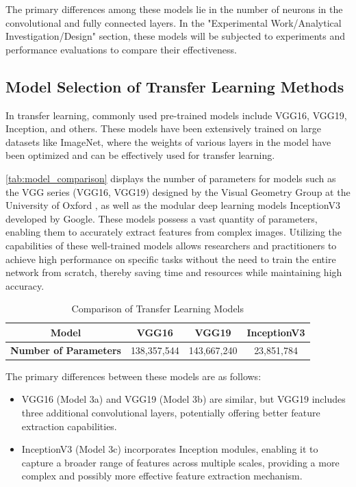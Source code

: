 The primary differences among these models lie in the number of neurons in the convolutional and fully connected layers. In the "Experimental Work/Analytical Investigation/Design" section, these models will be subjected to experiments and performance evaluations to compare their effectiveness.

\subsection{Model Selection of Transfer Learning Methods}
In transfer learning, commonly used pre-trained models include VGG16, VGG19, Inception, and others. These models have been extensively trained on large datasets like ImageNet, where the weights of various layers in the model have been optimized and can be effectively used for transfer learning\cite{4.30 7}.

\autoref{tab:model_comparison} displays the number of parameters for models such as the VGG series (VGG16, VGG19) designed by the Visual Geometry Group at the University of Oxford \cite{DL.5}, as well as the modular deep learning models InceptionV3 \cite{DL.6}\cite{DL.7} developed by Google. These models possess a vast quantity of parameters, enabling them to accurately extract features from complex images. Utilizing the capabilities of these well-trained models allows researchers and practitioners to achieve high performance on specific tasks without the need to train the entire network from scratch, thereby saving time and resources while maintaining high accuracy\cite{4.30 8}.

\begin{table}[H]
    \centering
    \caption{Comparison of Transfer Learning Models}
    \label{tab:model_comparison}
    \begin{tabular}{cccc}
        \toprule
        \textbf{Model} & \textbf{VGG16} & \textbf{VGG19} & \textbf{InceptionV3}\\
        \midrule
        \textbf{Number of Parameters} & 138,357,544 & 143,667,240 & 23,851,784 \\
        \bottomrule
    \end{tabular}
\end{table}

The primary differences between these models are as follows:

\begin{itemize}
\item VGG16 (Model 3a) and VGG19 (Model 3b) are similar, but VGG19 includes three additional convolutional layers, potentially offering better feature extraction capabilities.
\item InceptionV3 (Model 3c) incorporates Inception modules, enabling it to capture a broader range of features across multiple scales, providing a more complex and possibly more effective feature extraction mechanism.
\end{itemize}

